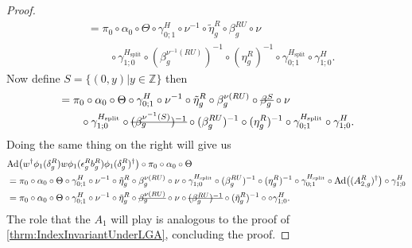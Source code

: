 \documentclass[12pt,a4paper,twoside]{article}
\newcommand{\stkout}[1]{\ifmmode\text{\sout{\ensuremath{#1}}}\else\sout{#1}\fi}
\let\originalleft\left
\let\originalright\right
\renewcommand{\left}{\mathopen{}\mathclose\bgroup\originalleft}
\renewcommand{\right}{\aftergroup\egroup\originalright}
\newcommand{\ZZ}{\mathbb Z}
\newcommand{\Ad}[1]{\textrm{Ad}\left(#1\right)}
\theoremstyle{definition}
\numberwithin{equation}{section}
\begin{document}
\begin{proof}
\begin{align}
		&=\pi_0\circ\alpha_0\circ\Theta\circ\gamma^H_{0;1}\circ\nu^{-1}\circ\tilde\eta_g^R\circ\beta_g^{RU}\circ\nu\\
		\nonumber
		&\qquad \circ\gamma^{H_\text{split}}_{1;0}\circ(\beta_g^{\nu^{-1}(RU)})^{-1}\circ(\eta_g^R)^{-1}\circ\gamma^{H_{\text{split}}}_{0;1}\circ\gamma^{H}_{1;0}.
	\end{align}
	Now define $S=\{(0,y)|y\in\ZZ\}$ then
	\begin{align}
		&=\pi_0\circ\alpha_0\circ\Theta\circ\gamma^H_{0;1}\circ\nu^{-1}\circ\tilde\eta_g^R\circ\beta_g^{\nu(RU)}\circ\stkout{\beta_g^S}\circ\nu\\
		\nonumber
		&\qquad \circ\gamma^{H_\text{split}}_{1;0}\circ\stkout{(\beta_g^{\nu^{-1}(S)})^{-1}}\circ(\beta_g^{RU})^{-1}\circ(\eta_g^R)^{-1}\circ\gamma^{H_{\text{split}}}_{0;1}\circ\gamma^{H}_{1;0}.
	\end{align}
	Doing the same thing on the right will give us
	\begin{align}
		&\Ad{w^\dagger\phi_1(\delta_g^R)w\phi_1(\epsilon_g^R b_g^R)\phi_1(\delta_g^R)^\dagger}\circ\pi_0\circ\alpha_0\circ\Theta\\
		&=\pi_0\circ\alpha_0\circ\Theta\circ\gamma^H_{0;1}\circ\nu^{-1}\circ\tilde\eta_g^R\circ\beta_g^{\nu(RU)}\circ\nu\circ\gamma^{H_\text{split}}_{1;0}\circ(\beta_g^{RU})^{-1}\circ(\eta_g^R)^{-1}\circ\gamma^{H_{\text{split}}}_{0;1}\circ\Ad{(A_{2,g}^R)^\dagger}\circ\gamma^{H}_{1;0}\\
		&=\pi_0\circ\alpha_0\circ\Theta\circ\gamma^H_{0;1}\circ\nu^{-1}\circ\tilde\eta_g^R\circ\stkout{\beta_g^{\nu(RU)}}\circ\nu\circ\stkout{(\beta_g^{RU})^{-1}}\circ(\tilde\eta_g^R)^{-1}\circ\circ\gamma^{H}_{1;0}.
	\end{align}
	The role that the $A_1$ will play is analogous to the proof of \ref{thrm:IndexInvariantUnderLGA}, concluding the proof.
\end{proof}
\end{document}
